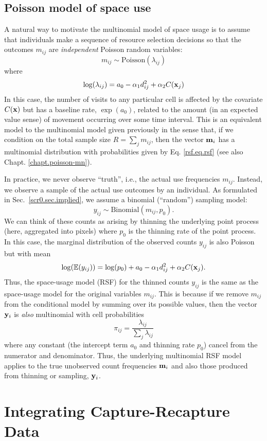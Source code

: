 \subsection{Poisson model of space use}

A natural way to motivate the multinomial model of space usage is to
assume that individuals make a sequence of resource selection
decisions so that the outcomes $m_{ij}$ are {\it
  independent} Poisson random variables:
\[
 m_{ij} \sim \mbox{Poisson}( \lambda_{ij})
\]
where
\[
 \log(\lambda_{ij}) = a_{0} -\alpha_{1} d_{ij}^{2} +  \alpha_{2} C({\bf x}_{j})
\]
In this case, the number of visits to any particular cell is affected
by the covariate $C({\bf x})$ but has a baseline rate, $\exp(a_{0})$,
related to the amount (in an expected value sense) of movement occurring over some time interval.
This is an equivalent model to the multinomial model given previously
in the sense that, if we condition on the total sample size $R =
\sum_{j} m_{ij}$, then the vector ${\bf m}_{i}$ has a multinomial
distribution with probabilities given by Eq. \ref{rsf.eq.rsf} (see
also Chapt. \ref{chapt.poisson-mn}).

In practice, we never observe ``truth'', i.e., the actual use
frequencies $m_{ij}$. Instead, we observe a sample of the actual use
outcomes by an individual.  As formulated in
Sec.~\ref{scr0.sec.implied}, we assume a binomial (``random'')
sampling model:
\[
 y_{ij} \sim \mbox{Binomial}(m_{ij}, p_{0}).
\]
We can think of these counts as arising by thinning the underlying
point process (here, aggregated into pixels) where $p_{0}$ is the
thinning rate of the point process.  In this case, the marginal
distribution of the observed counts $y_{ij}$ is also Poisson but with
mean
\[
 \log(\mathbb{E}(y_{ij}))  = \log(p_{0}) + a_{0} -\alpha_{1} d_{ij}^{2} +  \alpha_{2} C({\bf x}_{j}).
\]
Thus, the space-usage model (RSF) for the thinned counts $y_{ij}$ is
the same as the space-usage model for the original variables $m_{ij}$.
This is because if we remove $m_{ij}$ from the conditional model by
summing over its possible values, then the vector ${\bf y}_{i}$ is
{\it also} multinomial with cell probabilities
\[
\pi_{ij} = \frac{\lambda_{ij}}{\sum_{j} \lambda_{ij}}
\]
where any constant (the intercept term $a_0$ and thinning rate
$p_{0}$) cancel from the numerator and denominator. Thus, the
underlying multinomial RSF model applies to the true unobserved count
frequencies ${\bf m}_{i}$ and also those produced from thinning or
sampling, ${\bf y}_{i}$.


\section{Integrating Capture-Recapture Data}

